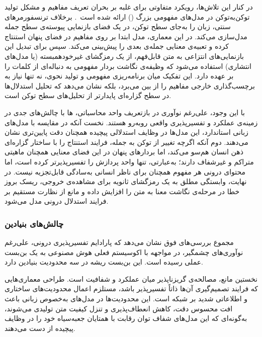 در کنار این تلاش‌ها، رویکرد متفاوتی برای غلبه بر بحران تعریف مفاهیم و مشکل تولید توکن‌به‌توکن در مدل‌های مفهومی بزرگ () ارائه شده است~\cite{lcmteam2024lcm}. برخلاف ترنسفورمرهای سنتی،  زبان را به‌جای سطح توکن، در یک فضای بازنمایی پیوسته‌ی سطح جمله مدل‌سازی می‌کند. در این معماری، مدل ابتدا بر روی مفاهیم در فضای پنهان استنتاج کرده و تعبیه‌ی معنایی جمله‌ی بعدی را پیش‌بینی می‌کند. سپس برای تبدیل این بازنمایی‌های انتزاعی به متن قابل‌فهم، از یک رمزگشای غیرخودهمبسته (یا مدل‌های انتشاری) استفاده می‌شود که وظیفه‌ی نگاشت بردار مفهومی به دنباله‌ای از کلمات را بر عهده دارد. این تفکیک میان برنامه‌ریزی مفهومی و تولید نحوی، نه تنها نیاز به برچسب‌گذاری خارجی مفاهیم را از بین می‌برد، بلکه نشان می‌دهد که تحلیل استدلال‌ها در سطح گزاره‌ای پایدارتر از تحلیل‌های سطح توکن است.

با این وجود، علی‌رغم نوآوری در بازتعریف واحد محاسباتی، ها با چالش‌های جدی در زمینه‌ی عملکرد و تفسیرپذیری واقعی روبه‌رو هستند. نخست آنکه در مقایسه با مدل‌های زبانی استاندارد، این مدل‌ها در وظایف استدلالی پیچیده همچنان دقت پایین‌تری نشان می‌دهند. دوم آنکه اگرچه تغییر از توکن به جمله، فرایند استنتاج را با ساختار گزاره‌ای ذهن انسان هم‌سو می‌کند، اما بردارهای پنهان در این فضای معنایی همچنان ماهیتی متراکم و غیرشفاف دارند؛ به‌عبارتی،  تنها واحد پردازش را تفسیرپذیرتر کرده است، اما محتوای درونی هر مفهوم همچنان برای ناظر انسانی به‌سادگی قابل‌تجزیه نیست. در نهایت، وابستگی مطلق به یک رمزگشای ثانویه برای مشاهده‌ی خروجی، ریسک بروز خطا در مرحله‌ی نگاشت معنا به متن را افزایش داده و مانع از نظارت مستقیم بر فرایند استدلال درونی مدل می‌شود.


\subsubsection{چالش‌های بنیادین}\label{sec:3-1-1-4}

مجموع بررسی‌های فوق نشان می‌دهد که پارادایم تفسیرپذیری درونی، علی‌رغم نوآوری‌های چشمگیر، در مواجهه با اکوسیستم فعلی هوش مصنوعی به یک بن‌بست عملی رسیده است. این بن‌بست ریشه در سه محدودیت بنیادین دارد.

نخستین مانع، مصالحه‌ی گریزناپذیر میان عملکرد و شفافیت است. طراحی معماری‌هایی که فرایند تصمیم‌گیری آن‌ها ذاتاً تفسیرپذیر باشد، مستلزم اعمال محدودیت‌های ساختاری و اطلاعاتی شدید بر شبکه است. این محدودیت‌ها در مدل‌های به‌خصوص زبانی باعث افت محسوس دقت، کاهش انعطاف‌پذیری و تنزل کیفیت متن تولیدی می‌شوند، به‌گونه‌ای که این مدل‌های شفاف توان رقابت با همتایان جعبه‌سیاه خود را در وظایف پیچیده از دست می‌دهند.

